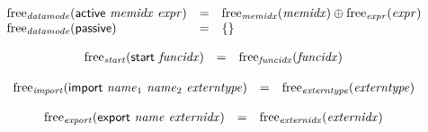$$
\begin{array}[t]{@{}lcl@{}l@{}}
{\mathrm{free}}_{\mathit{datamode}}(\mathsf{active}~{\mathit{memidx}}~{\mathit{expr}}) & = & {\mathrm{free}}_{\mathit{memidx}}({\mathit{memidx}}) \oplus {\mathrm{free}}_{\mathit{expr}}({\mathit{expr}}) \\
{\mathrm{free}}_{\mathit{datamode}}(\mathsf{passive}) & = & \{  \} \\
\end{array}
$$

$$
\begin{array}[t]{@{}lcl@{}l@{}}
{\mathrm{free}}_{\mathit{start}}(\mathsf{start}~{\mathit{funcidx}}) & = & {\mathrm{free}}_{\mathit{funcidx}}({\mathit{funcidx}}) \\
\end{array}
$$

$$
\begin{array}[t]{@{}lcl@{}l@{}}
{\mathrm{free}}_{\mathit{import}}(\mathsf{import}~{\mathit{name}}_1~{\mathit{name}}_2~{\mathit{externtype}}) & = & {\mathrm{free}}_{\mathit{externtype}}({\mathit{externtype}}) \\
\end{array}
$$

$$
\begin{array}[t]{@{}lcl@{}l@{}}
{\mathrm{free}}_{\mathit{export}}(\mathsf{export}~{\mathit{name}}~{\mathit{externidx}}) & = & {\mathrm{free}}_{\mathit{externidx}}({\mathit{externidx}}) \\
\end{array}
$$

